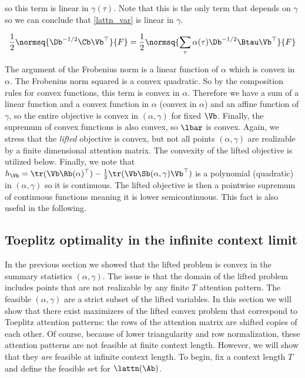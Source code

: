 \documentclass{article}
\begin{document}
so this term is linear in $\gamma(\tau)$. Note that this is the only term that depends on $\gamma$ so we can conclude that \eqref{lattn_var} is linear in $\gamma$. 

\begin{equation}
    \frac{1}{2}\normsq{\Db^{-1/2}\Cb\Vb^\top}{F} = \frac{1}{2}\normsq{\sum_\tau \alpha(\tau)\Db^{-1/2}\Btau\Vb^\top}{F}\\
\end{equation}

The argument of the Frobenius norm is a linear function of $\alpha$ which is convex in $\alpha$. The Frobenius norm squared is a convex quadratic. So by the composition rules for convex functions, this term is convex in $\alpha$. Therefore we have a sum of a linear function and a convex function in $\alpha$ (convex in $\alpha$) and an affine function of $\gamma$, so the entire objective is convex in $(\alpha, \gamma)$ for fixed $\Vb$. Finally, the supremum of convex functions is also convex, so $\lbar$ is convex. Again, we stress that the \textit{lifted} objective is convex, but not all points $(\alpha, \gamma)$ are realizable by a finite dimensional attention matrix. The convexity of the lifted objective is utilized below. Finally, we note that $h_{\Vb} = \tr(\Vb\Rb(\alpha)^\top) - \frac{1}{2}\tr(\Vb\Sb(\alpha, \gamma)\Vb^\top)$ is a polynomial (quadratic) in $(\alpha, \gamma)$ so it is continuous. The lifted objective is then a pointwise supremum of continuous functions meaning it is lower semicontinuous. This fact is also useful in the following. 

\subsection{Toeplitz optimality in the infinite context limit}
In the previous section we showed that the lifted problem is convex in the summary statistics $(\alpha, \gamma)$. The issue is that the domain of the lifted problem includes points that are not realizable by any finite $T$ attention pattern. The feasible $(\alpha, \gamma)$ are a strict subset of the lifted variables. In this section we will show that there exist maximizers of the lifted convex problem that correspond to Toeplitz attention patterns: the rows of the attention matrix are shifted copies of each other. Of course, because of lower triangularity and row normalization, these attention patterns are not feasible at finite context length. However, we will show that they \textit{are} feasible at infinite context length. To begin, fix a context length $T$ and define the feasible set for $\lattn(\Ab)$.
\end{document}
